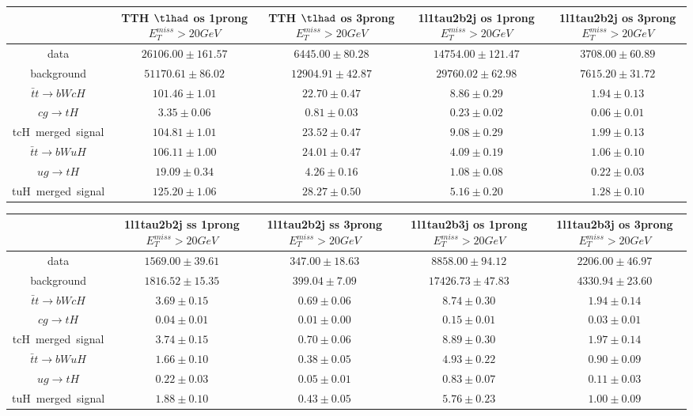 \begin{tabular}{|c|c|c|c|c|} \hline
 & TTH $\tlhad$ os 1prong  $E_T^{miss}>20GeV$ & TTH $\tlhad$ os 3prong  $E_T^{miss}>20GeV$ & 1l1tau2b2j os 1prong  $E_T^{miss}>20GeV$ & 1l1tau2b2j os 3prong  $E_T^{miss}>20GeV$\\\hline
data & $26106.00\pm161.57$ & $6445.00\pm80.28$ & $14754.00\pm121.47$ & $3708.00\pm60.89$\\\hline
background & $51170.61\pm86.02$ & $12904.91\pm42.87$ & $29760.02\pm62.98$ & $7615.20\pm31.72$\\\hline
$\bar{t}t\to bWcH$ & $101.46\pm1.01$ & $22.70\pm0.47$ & $8.86\pm0.29$ & $1.94\pm0.13$\\\hline
$cg\to tH$ & $3.35\pm0.06$ & $0.81\pm0.03$ & $0.23\pm0.02$ & $0.06\pm0.01$\\\hline
tcH~merged~signal & $104.81\pm1.01$ & $23.52\pm0.47$ & $9.08\pm0.29$ & $1.99\pm0.13$\\\hline
$\bar{t}t\to bWuH$ & $106.11\pm1.00$ & $24.01\pm0.47$ & $4.09\pm0.19$ & $1.06\pm0.10$\\\hline
$ug\to tH$ & $19.09\pm0.34$ & $4.26\pm0.16$ & $1.08\pm0.08$ & $0.22\pm0.03$\\\hline
tuH~merged~signal & $125.20\pm1.06$ & $28.27\pm0.50$ & $5.16\pm0.20$ & $1.28\pm0.10$\\\hline
\end{tabular}
\begin{tabular}{|c|c|c|c|c|} \hline
 & 1l1tau2b2j ss 1prong  $E_T^{miss}>20GeV$ & 1l1tau2b2j ss 3prong  $E_T^{miss}>20GeV$ & 1l1tau2b3j os 1prong  $E_T^{miss}>20GeV$ & 1l1tau2b3j os 3prong  $E_T^{miss}>20GeV$\\\hline
data & $1569.00\pm39.61$ & $347.00\pm18.63$ & $8858.00\pm94.12$ & $2206.00\pm46.97$\\\hline
background & $1816.52\pm15.35$ & $399.04\pm7.09$ & $17426.73\pm47.83$ & $4330.94\pm23.60$\\\hline
$\bar{t}t\to bWcH$ & $3.69\pm0.15$ & $0.69\pm0.06$ & $8.74\pm0.30$ & $1.94\pm0.14$\\\hline
$cg\to tH$ & $0.04\pm0.01$ & $0.01\pm0.00$ & $0.15\pm0.01$ & $0.03\pm0.01$\\\hline
tcH~merged~signal & $3.74\pm0.15$ & $0.70\pm0.06$ & $8.89\pm0.30$ & $1.97\pm0.14$\\\hline
$\bar{t}t\to bWuH$ & $1.66\pm0.10$ & $0.38\pm0.05$ & $4.93\pm0.22$ & $0.90\pm0.09$\\\hline
$ug\to tH$ & $0.22\pm0.03$ & $0.05\pm0.01$ & $0.83\pm0.07$ & $0.11\pm0.03$\\\hline
tuH~merged~signal & $1.88\pm0.10$ & $0.43\pm0.05$ & $5.76\pm0.23$ & $1.00\pm0.09$\\\hline
\end{tabular}
